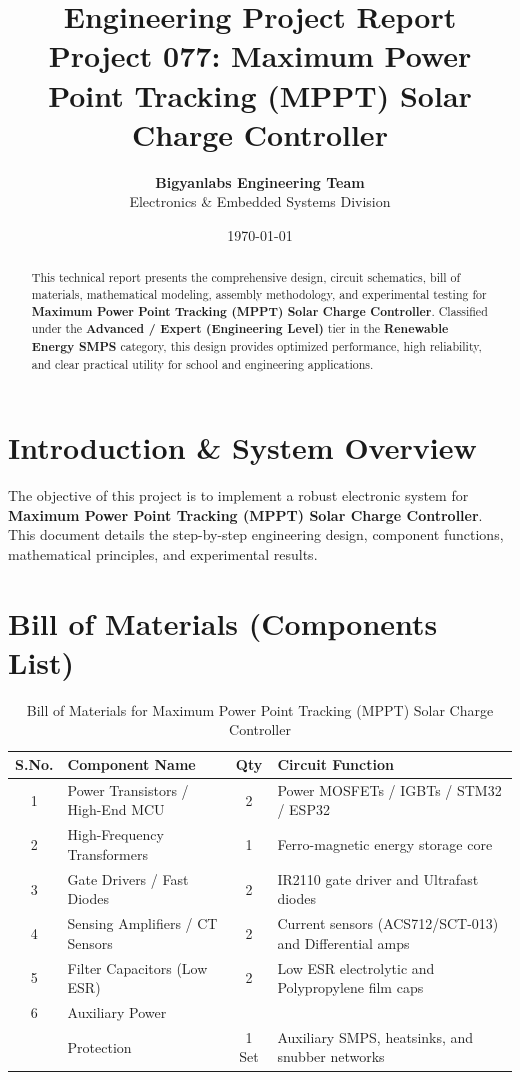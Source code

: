 \documentclass[11pt,a4paper]{article}
\title{\textbf{\Huge Engineering Project Report}\\[0.5em] \Large Project 077: Maximum Power Point Tracking (MPPT) Solar Charge Controller}
\author{\textbf{Bigyanlabs Engineering Team}\\ Electronics \& Embedded Systems Division}
\date{\today}
\begin{document}
\maketitle
\thispagestyle{empty}

\begin{abstract}
This technical report presents the comprehensive design, circuit schematics, bill of materials, mathematical modeling, assembly methodology, and experimental testing for \textbf{Maximum Power Point Tracking (MPPT) Solar Charge Controller}. Classified under the \textbf{Advanced / Expert (Engineering Level)} tier in the \textbf{Renewable Energy SMPS} category, this design provides optimized performance, high reliability, and clear practical utility for school and engineering applications.
\end{abstract}

\newpage
\tableofcontents
\newpage

\section{Introduction \& System Overview}
The objective of this project is to implement a robust electronic system for \textbf{Maximum Power Point Tracking (MPPT) Solar Charge Controller}. This document details the step-by-step engineering design, component functions, mathematical principles, and experimental results.

\section{Bill of Materials (Components List)}
\begin{table}[h!]
\centering
\caption{Bill of Materials for Maximum Power Point Tracking (MPPT) Solar Charge Controller}
\vspace{0.5em}
\begin{tabular}{clcp{7cm}}
\toprule
\textbf{S.No.} & \textbf{Component Name} & \textbf{Qty} & \textbf{Circuit Function} \\
\midrule
1 & Power Transistors / High-End MCU & 2 & Power MOSFETs / IGBTs / STM32 / ESP32 \\
2 & High-Frequency Transformers & 1 & Ferro-magnetic energy storage core \\
3 & Gate Drivers / Fast Diodes & 2 & IR2110 gate driver and Ultrafast diodes \\
4 & Sensing Amplifiers / CT Sensors & 2 & Current sensors (ACS712/SCT-013) and Differential amps \\
5 & Filter Capacitors (Low ESR) & 2 & Low ESR electrolytic and Polypropylene film caps \\
6 & Auxiliary Power \\& Protection & 1 Set & Auxiliary SMPS, heatsinks, and snubber networks \\
\bottomrule
\end{tabular}
\end{table}
\end{document}
